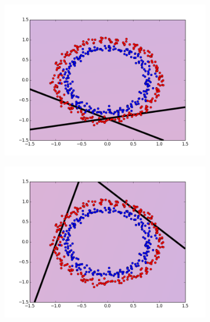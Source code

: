 \begin{figure}[H] %
\begin{subfigure}{0.48\textwidth}
\includegraphics[width=\linewidth]{figs/Circle/11-two-circle}
\caption{} \label{fig:Circle_all_single_a}
\end{subfigure}\hspace*{\fill}
\begin{subfigure}{0.48\textwidth}
\includegraphics[width=\linewidth]{figs/Circle/22-two-circle}
\caption{} \label{fig:Circle_all_single_b}
\end{subfigure}


\end{figure}
